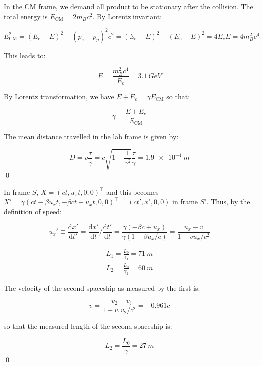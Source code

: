 \documentclass[12pt]{article}
\begin{document}
In the CM frame, we demand all product to be stationary after the collision. The total energy is $E_{\text{CM}} = 2m_{B}c^{2}$. By Lorentz invariant:

\begin{equation}
    E_{\text{CM}}^{2} = (E_{e} + E)^{2} - (p_{e} - p_{p})^{2} c^{2} = (E_{e} + E)^{2} - (E_{e} - E)^{2} = 4E_{e}E = 4m_{B}^{2}c^{4}
\end{equation}

This leads to:

\begin{equation}
    E = \frac{m_{B}^{2}c^{4}}{E_{e}} = \qty{3.1}{GeV}
\end{equation}

By Lorentz transformation, we have $E + E_{e} = \gamma E_{\text{CM}}$ so that:

\begin{equation}
    \gamma = \frac{E + E_{e}}{E_{\text{CM}}}
\end{equation}

The mean distance travelled in the lab frame is given by:

\begin{equation}
    D = v \frac{\tau}{\gamma} = c \sqrt{1 - \frac{1}{\gamma^{2}}} \frac{\tau}{\gamma} = \qty{1.9e-4}{m}
\end{equation}
\qed


In frame $S$, $X = (ct, u_{x}t, 0, 0)^{\intercal}$ and this becomes $X' = \gamma (ct - \beta u_{x}t, -\beta ct + u_{x}t, 0, 0)^{\intercal} = (ct', x', 0, 0)$ in frame $S'$. Thus, by the definition of speed:

\begin{equation}
    u_{x}' \equiv \frac{\mathrm{d}x'}{\mathrm{d}t'} = \frac{\mathrm{d}x'}{\mathrm{d}t}/\frac{\mathrm{d}t'}{\mathrm{d}t} = \frac{\gamma(-\beta c + u_{x})}{\gamma(1 - \beta u_{x}/c)} = \frac{u_{x} - v}{1 - v u_{x}/c^{2}}
\end{equation}

\begin{equation}
\begin{split}
    L_{1} = \frac{L_{0}}{\gamma_{1}} = \qty{71}{m} \\
    L_{2} = \frac{L_{0}}{\gamma_{2}} = \qty{60}{m}
\end{split}
\end{equation}

The velocity of the second spaceship as measured by the first is:

\begin{equation}
    v = \frac{-v_{2} - v_{1}}{1 + v_{1}v_{2}/c^{2}} = -0.961c
\end{equation}

so that the measured length of the second spaceship is:

\begin{equation}
    L_{2} = \frac{L_{0}}{\gamma} = \qty{27}{m}
\end{equation}
\qed
\end{document}
